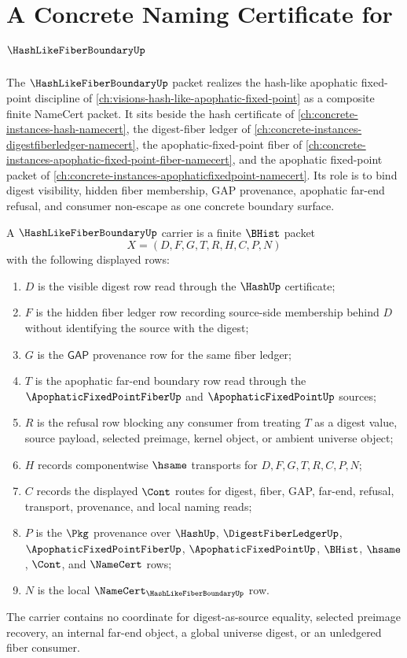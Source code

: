 \chapter{A Concrete Naming Certificate for $\HashLikeFiberBoundaryUp$}
\label{ch:concrete-instances-hashlikefiberboundary-namecert}

The $\HashLikeFiberBoundaryUp$ packet realizes the hash-like apophatic
fixed-point discipline of
\autoref{ch:visions-hash-like-apophatic-fixed-point} as a composite finite
NameCert packet. It sits beside the hash certificate of
\autoref{ch:concrete-instances-hash-namecert}, the digest-fiber ledger of
\autoref{ch:concrete-instances-digestfiberledger-namecert}, the
apophatic-fixed-point fiber of
\autoref{ch:concrete-instances-apophatic-fixed-point-fiber-namecert}, and the
apophatic fixed-point packet of
\autoref{ch:concrete-instances-apophaticfixedpoint-namecert}. Its role is to
bind digest visibility, hidden fiber membership, GAP provenance, apophatic
far-end refusal, and consumer non-escape as one concrete boundary surface.

\begin{definition}
\label{def:hash-like-fiber-boundary-carrier}
A $\HashLikeFiberBoundaryUp$ carrier is a finite $\BHist$ packet
$$
X=(D,F,G,T,R,H,C,P,N)
$$
with the following displayed rows:
\begin{enumerate}
\item $D$ is the visible digest row read through the $\HashUp$ certificate;
\item $F$ is the hidden fiber ledger row recording source-side membership
behind $D$ without identifying the source with the digest;
\item $G$ is the $\mathsf{GAP}$ provenance row for the same fiber ledger;
\item $T$ is the apophatic far-end boundary row read through the
$\ApophaticFixedPointFiberUp$ and $\ApophaticFixedPointUp$ sources;
\item $R$ is the refusal row blocking any consumer from treating $T$ as a
digest value, source payload, selected preimage, kernel object, or ambient
universe object;
\item $H$ records componentwise $\hsame$ transports for $D,F,G,T,R,C,P,N$;
\item $C$ records the displayed $\Cont$ routes for digest, fiber, GAP,
far-end, refusal, transport, provenance, and local naming reads;
\item $P$ is the $\Pkg$ provenance over $\HashUp$, $\DigestFiberLedgerUp$,
$\ApophaticFixedPointFiberUp$, $\ApophaticFixedPointUp$, $\BHist$, $\hsame$,
$\Cont$, and $\NameCert$ rows;
\item $N$ is the local $\NameCert_{\HashLikeFiberBoundaryUp}$ row.
\end{enumerate}
The carrier contains no coordinate for digest-as-source equality, selected
preimage recovery, an internal far-end object, a global universe digest, or an
unledgered fiber consumer.
\end{definition}

